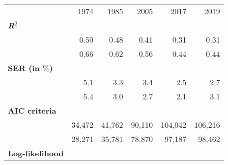 \begin{tabular}{llllll}
\cline{1-6}
\multicolumn{1}{c}{} &
  \multicolumn{1}{|r}{1974} &
  \multicolumn{1}{r}{1985} &
  \multicolumn{1}{r}{2005} &
  \multicolumn{1}{r}{2017} &
  \multicolumn{1}{r}{2019} \\
\cline{1-6}
\multicolumn{1}{l}{\textbf{\textit{R}$^2$}} &
  \multicolumn{1}{|r}{} &
  \multicolumn{1}{r}{} &
  \multicolumn{1}{r}{} &
  \multicolumn{1}{r}{} &
  \multicolumn{1}{r}{} \\
\multicolumn{1}{l}{\hspace{1em}{Model (A)}} &
  \multicolumn{1}{|r}{0.50} &
  \multicolumn{1}{r}{0.48} &
  \multicolumn{1}{r}{0.41} &
  \multicolumn{1}{r}{0.31} &
  \multicolumn{1}{r}{0.31} \\
\multicolumn{1}{l}{\hspace{1em}{Model (B)}} &
  \multicolumn{1}{|r}{0.66} &
  \multicolumn{1}{r}{0.62} &
  \multicolumn{1}{r}{0.56} &
  \multicolumn{1}{r}{0.44} &
  \multicolumn{1}{r}{0.44} \\
\multicolumn{1}{l}{\textbf{SER (in $\%$)}} &
  \multicolumn{1}{|r}{} &
  \multicolumn{1}{r}{} &
  \multicolumn{1}{r}{} &
  \multicolumn{1}{r}{} &
  \multicolumn{1}{r}{} \\
\multicolumn{1}{l}{\hspace{1em}{Model (A)}} &
  \multicolumn{1}{|r}{5.1} &
  \multicolumn{1}{r}{3.3} &
  \multicolumn{1}{r}{3.4} &
  \multicolumn{1}{r}{2.5} &
  \multicolumn{1}{r}{2.7} \\
\multicolumn{1}{l}{\hspace{1em}{Model (B)}} &
  \multicolumn{1}{|r}{5.4} &
  \multicolumn{1}{r}{3.0} &
  \multicolumn{1}{r}{2.7} &
  \multicolumn{1}{r}{2.1} &
  \multicolumn{1}{r}{3.1} \\
\multicolumn{1}{l}{\textbf{AIC criteria}} &
  \multicolumn{1}{|r}{} &
  \multicolumn{1}{r}{} &
  \multicolumn{1}{r}{} &
  \multicolumn{1}{r}{} &
  \multicolumn{1}{r}{} \\
\multicolumn{1}{l}{\hspace{1em}{Model (A)}} &
  \multicolumn{1}{|r}{34,472} &
  \multicolumn{1}{r}{41,762} &
  \multicolumn{1}{r}{90,110} &
  \multicolumn{1}{r}{104,042} &
  \multicolumn{1}{r}{106,216} \\
\multicolumn{1}{l}{\hspace{1em}{Model (B)}} &
  \multicolumn{1}{|r}{28,271} &
  \multicolumn{1}{r}{35,781} &
  \multicolumn{1}{r}{78,870} &
  \multicolumn{1}{r}{97,187} &
  \multicolumn{1}{r}{98,462} \\
\multicolumn{1}{l}{\textbf{Log-likelihood}} &

\end{tabular}
